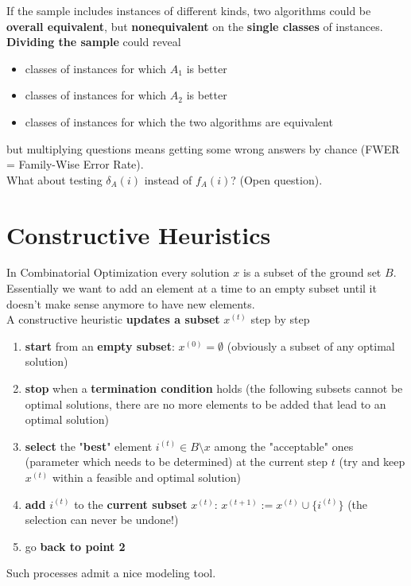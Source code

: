 \documentclass[11pt]{article}
\begin{document}
	If the sample includes instances of different kinds, two algorithms could be \textbf{overall equivalent}, but \textbf{nonequivalent} on the \textbf{single classes} of instances.\\
	
	\textbf{Dividing the sample} could reveal
	\begin{itemize}
		\item classes of instances for which $A_1$ is better
		\item classes of instances for which $A_2$ is better
		\item classes of instances for which the two algorithms are equivalent
	\end{itemize}
	but multiplying questions means getting some wrong answers by chance (FWER = Family-Wise Error Rate). \\
	
	What about testing $\delta_A (i)$ instead of $f_A (i )$? (Open question).\\
	
	
	\newpage
	
	\section{Constructive Heuristics}
	In Combinatorial Optimization every solution $x$ is a subset of the ground set $B$.\\
	
	Essentially we want to add an element at a time to an empty subset until it doesn't make sense anymore to have new elements.\\
	
	A constructive heuristic \textbf{updates a subset} $x^{(t)}$ step by step
	\begin{enumerate}
		\item \textbf{start} from an \textbf{empty subset}: $x^{(0)} = \emptyset$ (obviously a subset of any optimal solution)
		\item \textbf{stop} when a \textbf{termination condition} holds (the following subsets cannot be optimal solutions, there are no more elements to be added that lead to an optimal solution)
		\item \textbf{select} the "\textbf{best}" element $i^{(t)} \in B \setminus x$ among the "acceptable" ones (parameter which needs to be determined) at the current step $t$ (try and keep $x^{(t)}$ within a feasible and optimal solution)
		\item \textbf{add} $i^{(t)}$ to the \textbf{current subset} $x^{(t)}: \, x^{(t+1)} := x^{(t)} \cup \{i^{(t)}\}$ (the selection can never be undone!)
		\item go \textbf{back to point 2}
	\end{enumerate}
	Such processes admit a nice modeling tool.\\
	
\end{document}
